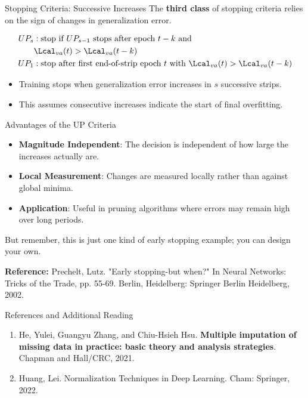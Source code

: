 \documentclass[aspectratio=169,xcolor=dvipsnames,svgnames,x11names,fleqn]{beamer}
\begin{document}
\begin{frame}{Stopping Criteria: Successive Increases}
    The \textbf{third class} of stopping criteria relies on the sign of changes in generalization error.
    
    \vfill
    
    \begin{align*}
        UP_s &: \text{stop if } UP_{s-1} \text{ stops after epoch } t - k \text{ and} \\
        &\Lcal_{va}(t) > \Lcal_{va}(t - k) \\
        UP_1 &: \text{stop after first end-of-strip epoch } t \text{ with } \Lcal_{va}(t) > \Lcal_{va}(t - k)
    \end{align*}
    
    \vfill
    
    \begin{itemize}
        \item Training stops when generalization error increases in $s$ successive strips.
        \item This assumes consecutive increases indicate the start of final overfitting.
    \end{itemize}
\end{frame}

\begin{frame}{Advantages of the UP Criteria}
    \vfill
    
    \begin{itemize}
        \item \textbf{Magnitude Independent}: The decision is independent of how large the increases actually are.
        \item \textbf{Local Measurement}: Changes are measured locally rather than against global minima.
        \item \textbf{Application}: Useful in pruning algorithms where errors may remain high over long periods.
    \end{itemize}
    
    \vfill
    
    But remember, this is just one kind of early stopping example; you can design your own.
    
    \textbf{Reference:} Prechelt, Lutz. "Early stopping-but when?" In Neural Networks: Tricks of the Trade, pp. 55-69. Berlin, Heidelberg: Springer Berlin Heidelberg, 2002.
\end{frame}

\begin{frame}{References and Additional Reading}

\footnotesize

\begin{enumerate}
\item He, Yulei, Guangyu Zhang, and Chiu-Hsieh Hsu. \textbf{Multiple imputation of missing data in practice: basic theory and analysis strategies}. Chapman and Hall/CRC, 2021.
\item Huang, Lei. Normalization Techniques in Deep Learning. Cham: Springer, 2022.
\end{enumerate}

\end{frame}
\end{document}

